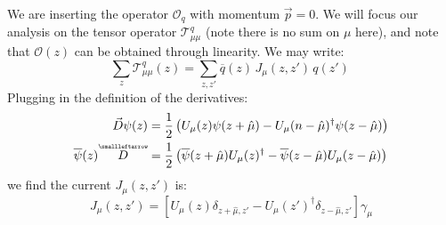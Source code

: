 \documentclass[11pt, oneside]{article}   	%
\theoremstyle{definition}
\newcommand{\cev}[1]{\overset{\scriptscriptstyle\smallleftarrow}{#1}}
\begin{document}
We are inserting the operator $\mathcal O_q$ with momentum $\vec p = 0$. We will focus our analysis on the tensor operator 
$\mathcal T^q_{\mu\mu}$ (note there is no sum on $\mu$ here), and note that $\mathcal O(z)$ can be obtained through 
linearity. We may write:
\begin{equation}
	\sum_z\mathcal T^q_{\mu\mu}(z) = \sum_{z, z'}\overline q(z)\, J_\mu(z, z')\,q(z')~
	\label{eq:operator_mom_proj}
\end{equation}
Plugging in the definition of the derivatives:
\begin{align}
	\vec D\psi(z) &= \frac{1}{2}\left(U_\mu(z)\psi(z + \hat\mu) - U_\mu(n - \hat\mu)^\dagger \psi(z - \hat\mu)\right) \\
	\overline\psi(z) \cev D &= \frac{1}{2}\left(\overline\psi(z + \hat\mu)U_\mu(z)^\dagger - 
	\overline\psi(z - \hat\mu) U_\mu(z - \hat\mu)\right)
\end{align}
we find the current $J_\mu(z, z')$ is:
\begin{equation}
	J_\mu(z, z') = \left[U_\mu(z) \delta_{z + \hat\mu, z'} - U_\mu(z')^\dagger\delta_{z - \hat\mu, z'}\right]\gamma_\mu
\end{equation}
\end{document}
